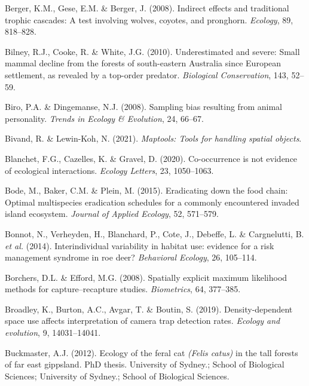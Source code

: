 \documentclass[11pt,a4paper,titlepage,twoside,openright]{style/unimelbthesis}
\begin{document}
\begin{mainmatter}
\leavevmode\hypertarget{ref-berger2008indirect}{}%
Berger, K.M., Gese, E.M. \& Berger, J. (2008). Indirect effects and traditional trophic cascades: A test involving wolves, coyotes, and pronghorn. \emph{Ecology}, 89, 818--828.

\leavevmode\hypertarget{ref-bilney2010underestimated}{}%
Bilney, R.J., Cooke, R. \& White, J.G. (2010). Underestimated and severe: Small mammal decline from the forests of south-eastern Australia since European settlement, as revealed by a top-order predator. \emph{Biological Conservation}, 143, 52--59.

\leavevmode\hypertarget{ref-biro2008sampling}{}%
Biro, P.A. \& Dingemanse, N.J. (2008). Sampling bias resulting from animal personality. \emph{Trends in Ecology \& Evolution}, 24, 66--67.

\leavevmode\hypertarget{ref-maptools}{}%
Bivand, R. \& Lewin-Koh, N. (2021). \emph{Maptools: Tools for handling spatial objects}.

\leavevmode\hypertarget{ref-guillaume2020co-occurrence}{}%
Blanchet, F.G., Cazelles, K. \& Gravel, D. (2020). Co-occurrence is not evidence of ecological interactions. \emph{Ecology Letters}, 23, 1050--1063.

\leavevmode\hypertarget{ref-bode2015eradicating}{}%
Bode, M., Baker, C.M. \& Plein, M. (2015). Eradicating down the food chain: Optimal multispecies eradication schedules for a commonly encountered invaded island ecosystem. \emph{Journal of Applied Ecology}, 52, 571--579.

\leavevmode\hypertarget{ref-bonnot2014interindividual}{}%
Bonnot, N., Verheyden, H., Blanchard, P., Cote, J., Debeffe, L. \& Cargnelutti, B. \emph{et al.} (2014). Interindividual variability in habitat use: evidence for a risk management syndrome in roe deer? \emph{Behavioral Ecology}, 26, 105--114.

\leavevmode\hypertarget{ref-borchers2008spatially}{}%
Borchers, D.L. \& Efford, M.G. (2008). Spatially explicit maximum likelihood methods for capture--recapture studies. \emph{Biometrics}, 64, 377--385.

\leavevmode\hypertarget{ref-broadley2019density}{}%
Broadley, K., Burton, A.C., Avgar, T. \& Boutin, S. (2019). Density-dependent space use affects interpretation of camera trap detection rates. \emph{Ecology and evolution}, 9, 14031--14041.

\leavevmode\hypertarget{ref-buckmaster2012ecology}{}%
Buckmaster, A.J. (2012). Ecology of the feral cat \emph{(Felis catus)} in the tall forests of far east gippsland. PhD thesis. University of Sydney.; School of Biological Sciences; University of Sydney.; School of Biological Sciences.


\end{mainmatter}
\end{document}
